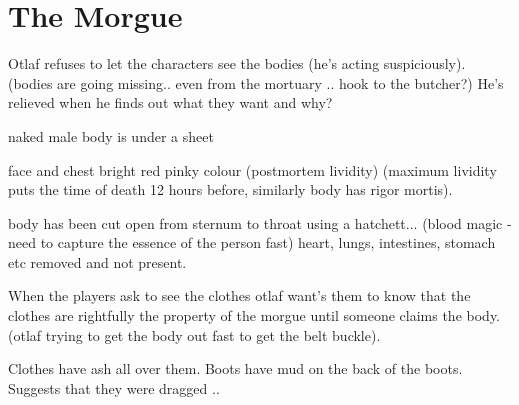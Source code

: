 \documentclass[a4paper]{dnd5}
\begin{document}
\section*{The Morgue}


\begin{precis}
\item Otlaf refuses to let the characters see the bodies (he's acting suspiciously).
   (bodies are going missing.. even from the mortuary .. hook to the butcher?) 
   He's relieved when he finds out what they want and why?

\item naked male body is under a sheet
\item face and chest bright red pinky colour (postmortem lividity)
(maximum lividity puts the time of death 12 hours before, similarly body has rigor mortis). 
\item body has been cut open from sternum to throat using a hatchett...
(blood magic - need to capture the essence of the person fast)
heart, lungs, intestines, stomach etc removed and not present.

\item When the players ask to see the clothes otlaf want's them to know that the clothes are 
rightfully the property of the morgue until someone claims the body.
(otlaf trying to get the body out fast to get the belt buckle).

\item Clothes have ash all over them.  Boots have mud on the back of the boots.  
Suggests that they were dragged .. 
\end{precis}


\begin{outs} 
\item 
\item 
\end{outs}

\begin{purpose}
\item 
\item 
\end{purpose}
     
\end{document}
